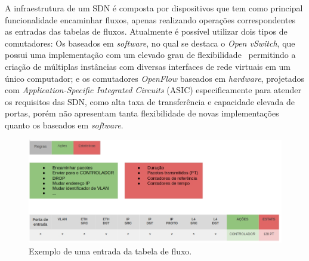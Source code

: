 A infraestrutura de um SDN é composta por dispositivos que tem como principal funcionalidade encaminhar  fluxos, apenas realizando operações correspondentes as entradas das tabelas de fluxos. Atualmente é possível utilizar dois tipos de comutadores: Os baseados em \textit{software}, no qual se destaca o \textit{Open vSwitch}, que possui uma implementação com um elevado grau de flexibilidade~\cite{openVsw2010} permitindo a criação de múltiplas instâncias com diversas interfaces de rede virtuais em um único computador; e os comutadores \textit{OpenFlow} baseados em \textit{hardware}, projetados com \emph{Application-Specific Integrated Circuits} (ASIC) especificamente para atender os requisitos das SDN, como alta taxa de transferência e capacidade elevada de portas, porém não apresentam tanta flexibilidade de novas implementações quanto os baseados em \textit{software}.


\begin{figure}[!htb]
	\caption{\label{fig:entrada_tabela_fluxo} Exemplo de uma entrada da tabela de fluxo.}
	\begin{center}
	    \includegraphics[scale=0.45]{imagens/entrada.jpg}
	\end{center}
\end{figure}


